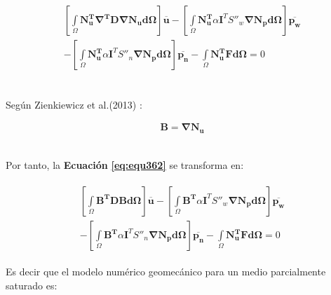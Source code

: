 \begin{ceqn} %
\begin{gather}\label{eq:equ362}
\begin{multlined}
\left[\int\limits_\Omega \mathbf{N_{u}^T}\mathbf{\nabla^T}\mathbf{D}\mathbf{\nabla}\mathbf{N_u}\mathbf{d\Omega}\right]\mathbf{\overline{u}} - \left[\int\limits_\Omega \mathbf{N_{u}^T} \alpha\mathbf{I}^TS''_w\mathbf{\nabla}\mathbf{N_p}\mathbf{d\Omega}\right]\mathbf{\overline{p_w}}\\[12pt] 
- \left[\int\limits_\Omega \mathbf{N_{u}^T}\alpha\mathbf{I}^TS''_n\mathbf{\nabla}\mathbf{N_p}\mathbf{d\Omega}\right]\mathbf{\overline{p_n}} - \int\limits_\Omega \mathbf{N_{u}^T} \mathbf{F}\mathbf{d\Omega} = 0
\end{multlined}
\end{gather}   
\end{ceqn}
\\
Según Zienkiewicz et al.(2013) \cite{Zienkiewicz2013TheFundamentals}:

\begin{ceqn} %
\begin{gather}\label{eq:equ63}
\mathbf{B} = \mathbf{\nabla N_u}
\end{gather}   
\end{ceqn}
\\
Por tanto, la \textbf{Ecuación} \textbf{\ref{eq:equ362}} se transforma en:

\begin{ceqn} %
\begin{gather}\label{eq:equ364}
\begin{multlined}
\left[\int\limits_\Omega \mathbf{B^T}\mathbf{D}\mathbf{B}\mathbf{d\Omega}\right]\mathbf{\overline{u}} - \left[\int\limits_\Omega \mathbf{B^T} \alpha\mathbf{I}^TS''_w\mathbf{\nabla}\mathbf{N_p}\mathbf{d\Omega}\right]\mathbf{\overline{p_w}}\\[12pt] 
- \left[\int\limits_\Omega \mathbf{B^T}\alpha\mathbf{I}^TS''_n\mathbf{\nabla}\mathbf{N_p}\mathbf{d\Omega}\right]\mathbf{\overline{p_n}} - \int\limits_\Omega \mathbf{N_{u}^T} \mathbf{F}\mathbf{d\Omega} = 0
\end{multlined}
\end{gather}   
\end{ceqn}
\bigskip
Es decir que  el modelo numérico geomecánico para un medio parcialmente saturado es:


